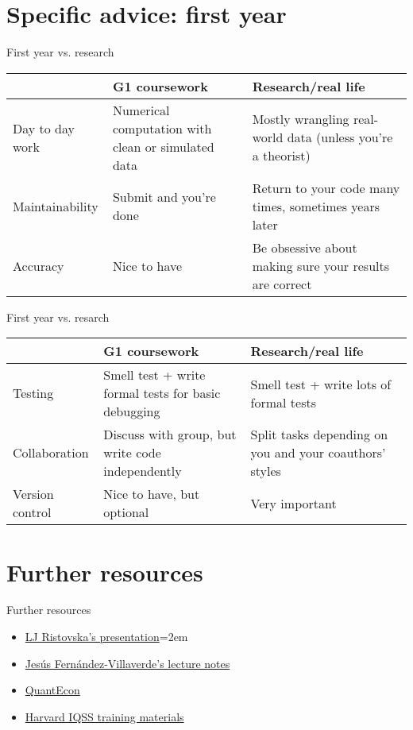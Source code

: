 \documentclass{beamer}
\begin{document}
\section{Specific advice: first year}

\begin{frame}{First year vs. research}
    \begin{tabular}{p{2.5cm}|p{3.5cm}|p{3.5cm}}
    & G1 coursework & Research/real life \\
    \hline
    Day to day work &
Numerical computation with clean or simulated data &
Mostly wrangling real-world data (unless you're a theorist) \\
\hline
Maintainability &
Submit and you're done &
Return to your code many times, sometimes years later \\
\hline
Accuracy &
Nice to have &
Be obsessive about making sure your results are correct \\
    \end{tabular}
\end{frame}

\begin{frame}{First year vs. resarch}
    \begin{tabular}{p{2cm}|p{4cm}|p{4cm}}
    & G1 coursework & Research/real life \\
    \hline
Testing &
Smell test + write formal tests for basic debugging &
Smell test + write lots of formal tests \\
\hline
Collaboration &
Discuss with group, but write code independently &
Split tasks depending on you and your coauthors' styles \\
\hline
Version control &
Nice to have, but optional &
Very important
    \end{tabular}
\end{frame}

\section{Further resources}
\begin{frame}{Further resources}
\begin{itemize}
    \item \href{https://scholar.harvard.edu/ristovska/resources}{LJ Ristovska's presentation}\itemsep=2em
    \item \href{https://www.sas.upenn.edu/~jesusfv/teaching.html}{Jesús Fernández-Villaverde's lecture notes}
    \item \href{https://quantecon.org/}{QuantEcon}
    \item \href{https://www.iq.harvard.edu/data-science-services/workshop-materials}{Harvard IQSS training materials}
\end{itemize}
\end{frame}
\end{document}
